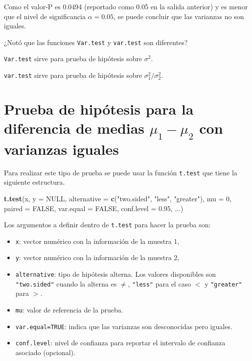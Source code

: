 \documentclass[10pt,]{krantz}
\makeatletter
\newenvironment{Shaded}{\begin{snugshade}}{\end{snugshade}}
\newcommand{\KeywordTok}[1]{\textcolor[rgb]{0.13,0.29,0.53}{\textbf{#1}}}
\newcommand{\DataTypeTok}[1]{\textcolor[rgb]{0.13,0.29,0.53}{#1}}
\newcommand{\DecValTok}[1]{\textcolor[rgb]{0.00,0.00,0.81}{#1}}
\newcommand{\FloatTok}[1]{\textcolor[rgb]{0.00,0.00,0.81}{#1}}
\newcommand{\StringTok}[1]{\textcolor[rgb]{0.31,0.60,0.02}{#1}}
\newcommand{\OtherTok}[1]{\textcolor[rgb]{0.56,0.35,0.01}{#1}}
\newcommand{\NormalTok}[1]{#1}
\providecommand{\tightlist}{%
  \setlength{\itemsep}{0pt}\setlength{\parskip}{0pt}}
\newenvironment{kframe}{%
\medskip{}
\setlength{\fboxsep}{.8em}
 \def\at@end@of@kframe{}%
 \ifinner\ifhmode%
  \def\at@end@of@kframe{\end{minipage}}%
  \begin{minipage}{\columnwidth}%
 \fi\fi%
 \def\FrameCommand##1{\hskip\@totalleftmargin \hskip-\fboxsep
 \colorbox{shadecolor}{##1}\hskip-\fboxsep
     \hskip-\linewidth \hskip-\@totalleftmargin \hskip\columnwidth}%
 \MakeFramed {\advance\hsize-\width
   \@totalleftmargin\z@ \linewidth\hsize
   \@setminipage}}%
 {\par\unskip\endMakeFramed%
 \at@end@of@kframe}
\renewenvironment{Shaded}{\begin{kframe}}{\end{kframe}}
\let\BeginKnitrBlock\begin \let\EndKnitrBlock\end
\makeatother
\begin{document}
Como el valor-P es 0.0494 (reportado como 0.05 en la salida anterior) y
es menor que el nivel de significancia \(\alpha=0.05\), se puede
concluir que las varianzas no son iguales.

\BeginKnitrBlock{rmdwarning}
¿Notó que las funciones \texttt{Var.test} y \texttt{var.test} son
diferentes?

\texttt{Var.test} sirve para prueba de hipótesis sobre \(\sigma^2\).

\texttt{var.test} sirve para prueba de hipótesis sobre
\(\sigma_1^2 / \sigma_2^2\).
\EndKnitrBlock{rmdwarning}

\section{\texorpdfstring{Prueba de hipótesis para la diferencia de
medias \(\mu_1-\mu_2\) con varianzas
iguales}{Prueba de hipótesis para la diferencia de medias \textbackslash{}mu\_1-\textbackslash{}mu\_2 con varianzas iguales}}\label{prueba-de-hipotesis-para-la-diferencia-de-medias-mu_1-mu_2-con-varianzas-iguales}

Para realizar este tipo de prueba se puede usar la función
\texttt{t.test} que tiene la siguiente estructura.

\begin{Shaded}
\begin{Highlighting}[]
\KeywordTok{t.test}\NormalTok{(x, }\DataTypeTok{y =} \OtherTok{NULL}\NormalTok{,}
       \DataTypeTok{alternative =} \KeywordTok{c}\NormalTok{(}\StringTok{"two.sided"}\NormalTok{, }\StringTok{"less"}\NormalTok{, }\StringTok{"greater"}\NormalTok{),}
       \DataTypeTok{mu =} \DecValTok{0}\NormalTok{, }\DataTypeTok{paired =} \OtherTok{FALSE}\NormalTok{, }\DataTypeTok{var.equal =} \OtherTok{FALSE}\NormalTok{,}
       \DataTypeTok{conf.level =} \FloatTok{0.95}\NormalTok{, ...)}
\end{Highlighting}
\end{Shaded}

Los argumentos a definir dentro de \texttt{t.test} para hacer la prueba
son:

\begin{itemize}
\tightlist
\item
  \texttt{x}: vector numérico con la información de la muestra 1,
\item
  \texttt{y}: vector numérico con la información de la muestra 2,
\item
  \texttt{alternative}: tipo de hipótesis alterna. Los valores
  disponibles son \texttt{"two.sided"} cuando la alterna es \(\neq\),
  \texttt{"less"} para el caso \(<\) y \texttt{"greater"} para \(>\).
\item
  \texttt{mu}: valor de referencia de la prueba.
\item
  \texttt{var.equal=TRUE}: indica que las varianzas son desconocidas
  pero iguales.
\item
  \texttt{conf.level}: nivel de confianza para reportar el intervalo de
  confianza asociado (opcional).
\end{itemize}
\end{document}
